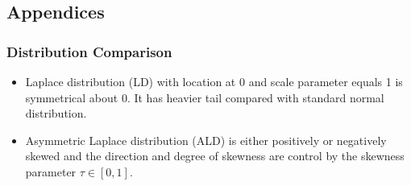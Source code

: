 




% 


\subsection*{Appendices}
\renewcommand{\thesubsubsection}{\Alph{subsubsection}}

\subsubsection{Distribution Comparison}

\begin{itemize}
\item Laplace distribution (LD) with location at 0 and scale parameter equals 1 is symmetrical about 0. It has heavier tail compared with standard normal distribution.
\item Asymmetric Laplace distribution (ALD) is either positively or negatively skewed and the direction and degree of skewness are control by the skewness parameter $\tau \in [0,1]$.
\end{itemize}


